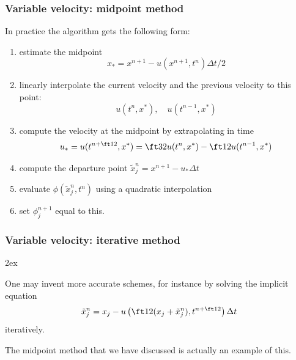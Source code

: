 \documentclass[aspectratio=149,9pt]{beamer}
\begin{document}
%
%
\begin{frame}
	\frametitle{Variable velocity: midpoint method}
	In practice the algorithm gets the following form:
	\begin{enumerate}
		\item estimate the midpoint
			\[x_*= x^{n+1} - u(x^{n+1}, t^n ) \Delta t/2 \]
		\item linearly interpolate the current velocity and the previous velocity to this point:
			\[u(t^n,x^*),\quad u(t^{n-1},x^*)\]
		\item compute the velocity at the midpoint by extrapolating in time
			\[u_*=u ( t^{n+\ft12}, x^* ) = \ft32 u(t^n,x^*) - \ft12 u(t^{n-1},x^*)\]
		\item compute the departure point $\tilde x_j^n = x^{n+1} - u_* \Delta t$
		\item evaluate $\phi ( \tilde x_j^n, t^n)$ using a quadratic interpolation
		\item set $\phi_j^{n+1}$ equal to this.
	\end{enumerate}
\end{frame}
%
%
\begin{frame}
	\frametitle{Variable velocity: iterative method}
	\begin{myitemize}{2ex}
		\item One may invent more accurate schemes, for instance by solving the implicit equation
			\begin{equation*}
				\tilde x_j^n = x_j - u \left( \ft12 (x_j + \tilde x_j^n ), t^{n+\ft12}\right)\Delta t
			\end{equation*}
			iteratively.
		\item The midpoint method that we have discussed is actually an example of this.	
	\end{myitemize}
\end{frame}
%
%
\end{document}

